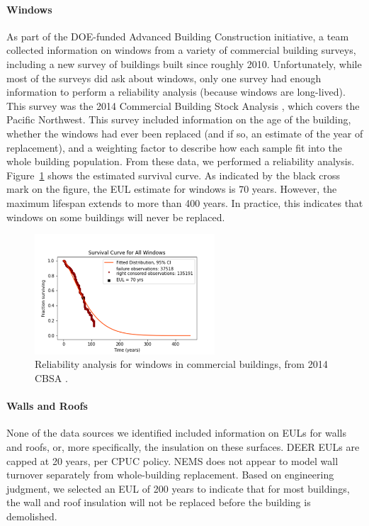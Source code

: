 \paragraph{Windows}
As part of the DOE-funded Advanced Building Construction initiative, a team collected information on windows from a variety of commercial building surveys, including a new survey of buildings built since roughly 2010. Unfortunately, while most of the surveys did ask about windows, only one survey had enough information to perform a reliability analysis (because windows are long-lived). This survey was the 2014 Commercial Building Stock Analysis \citep{neea2014cbsa}, which covers the Pacific Northwest. This survey included information on the age of the building, whether the windows had ever been replaced (and if so, an estimate of the year of replacement), and a weighting factor to describe how each sample fit into the whole building population. From these data, we performed a reliability analysis. Figure~\ref{fig:comWindowSurvivalCurve} shows the estimated survival curve. As indicated by the black cross mark on the figure, the EUL estimate for windows is 70 years. However, the maximum lifespan extends to more than 400 years. In practice, this indicates that windows on some buildings will never be replaced.

\begin{figure}
\includegraphics[width=0.6\textwidth]{figures/window_survival_curve.png}
\centering
\caption[Reliability analysis for windows in commercial buildings]{Reliability analysis for windows in commercial buildings, from 2014 CBSA \citep{neea2014cbsa}.}
\label{fig:comWindowSurvivalCurve}
\end{figure}

\paragraph{Walls and Roofs}
None of the data sources we identified included information on EULs for walls and roofs, or, more specifically, the insulation on these surfaces. DEER EULs are capped at 20 years, per CPUC policy. NEMS does not appear to model wall turnover separately from whole-building replacement. Based on engineering judgment, we selected an EUL of 200 years to indicate that for most buildings, the wall and roof insulation will not be replaced before the building is demolished.

